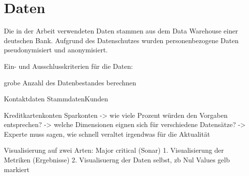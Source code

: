 \chapter{Daten}\label{ch:data}

Die in der Arbeit verwendeten Daten stammen aus dem Data Warehouse einer deutschen Bank.
Aufgrund des Datenschutzes wurden personenbezogene Daten pseudonymisiert und anonymisiert.

Ein- und Ausschlusskriterien für die Daten:

grobe Anzahl des Datenbestandes berechnen

Kontaktdaten
StammdatenKunden


Kreditkartenkonten
Sparkonten
-> wie viele Prozent würden den Vorgaben entsprechen? 
-> welche Dimensionen eignen sich für verschiedene Datensätze?
-> Experte muss sagen, wie schnell veraltet irgendwas für die Aktualität

Visualisierung auf zwei Arten: Major critical (Sonar)
1. Visualisierung der Metriken (Ergebnisse)
2. Visualisuerng der Daten selbst, zb Nul Values gelb markiert
